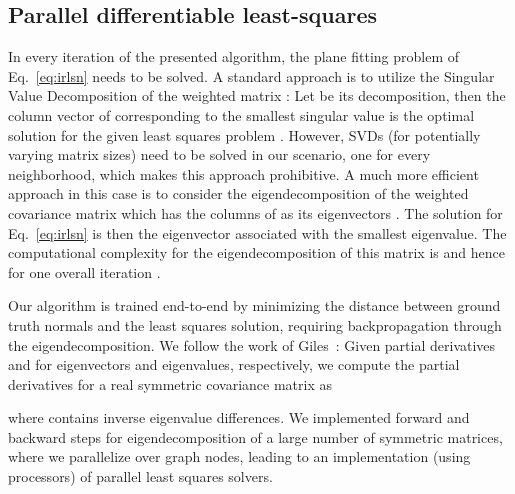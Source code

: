 \documentclass[10pt,twocolumn,letterpaper]{article}
\begin{document}
\subsection{Parallel differentiable least-squares}
In every iteration of the presented algorithm, the plane fitting problem of Eq.~\ref{eq:irlsn} needs to be solved. A standard approach is to utilize the Singular Value Decomposition of the weighted matrix : Let  be its decomposition, then the column vector of  corresponding to the smallest singular value is the optimal solution for the given least squares problem \cite{Hartley:2003, Ranftl:2018}. However,  SVDs (for potentially varying matrix sizes) need to be solved in our scenario, one for every neighborhood, which makes this approach prohibitive. A much more efficient approach in this case is to consider the eigendecomposition of the weighted  covariance matrix  which has the columns of  as its eigenvectors \cite{Hartley:2003}. The solution for Eq.~\ref{eq:irlsn} is then the eigenvector associated with the smallest eigenvalue. The computational complexity for the eigendecomposition of this  matrix is  and hence for one overall iteration .

Our algorithm is trained end-to-end by minimizing the distance between ground truth normals and the least squares solution, requiring backpropagation through the eigendecomposition. We follow the work of \mbox{Giles \cite{Giles:2008}}:  Given partial derivatives  and  for eigenvectors and eigenvalues, respectively, we compute the partial derivatives for a real symmetric  covariance matrix  as

where  contains inverse eigenvalue differences.
We implemented forward and backward steps for eigendecomposition of a large number of symmetric  matrices, where we parallelize over graph nodes, leading to an  implementation (using  processors) of parallel least squares solvers. 
\end{document}
